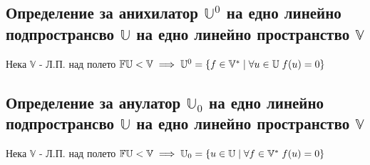 \documentclass{article}
\newcommand{\V}{\mathbb{V}}
\newcommand{\F}{\mathbb{F}}
\newcommand{\UV}{\mathbb{U}}
\begin{document}
    \subsection{Определение за анихилатор \(\UV^0\) на едно линейно подпространсво \(\UV\) на едно линейно пространство \(\V\)}
    Нека \(\V\) - Л.П. над полето \(\F \\\\
    \UV < \V \implies \UV^0 = \{f \in \V^* \; | \; \forall u \in \UV \; f(u) = 0\}\)
    \subsection{Определение за анулатор \(\UV_0\) на едно линейно подпространсво \(\UV\) на едно линейно пространство \(\V\)}
    Нека \(\V\) - Л.П. над полето \(\F \\\\
    \UV < \V \implies \UV_0 = \{u \in \UV \; | \; \forall f \in \V^* \; f(u) = 0\}\)
\end{document}
